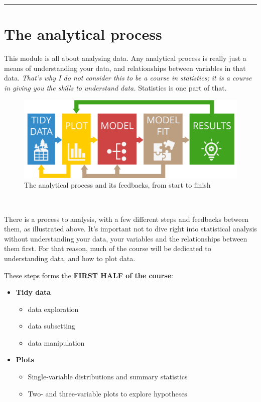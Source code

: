 \documentclass[
]{book}
\providecommand{\tightlist}{%
  \setlength{\itemsep}{0pt}\setlength{\parskip}{0pt}}
\begin{document}
\begin{center}\rule{0.5\linewidth}{0.5pt}\end{center}

\hypertarget{the-analytical-process}{%
\section{The analytical process}\label{the-analytical-process}}

This module is all about analysing data.
Any analytical process is really just a means of understanding your data, and
relationships between variables in that data. \emph{That's why I do not consider this}
\emph{to be a course in statistics; it is a course in giving you the skills to}
\emph{understand data.} Statistics is one part of that.\\
\hspace*{0.333em}

\begin{figure}
\centering
\includegraphics{Process.png}
\caption{The analytical process and its feedbacks, from start to finish}
\end{figure}

~

There is a process to analysis, with a few different steps and feedbacks between
them, as illustrated above. It's important not to dive right into statistical
analysis without understanding your data, your variables and the relationships
between them first. For that reason, much of the course will be dedicated to
understanding data, and how to plot data.

These steps forms the \textbf{FIRST HALF of the course}:

\begin{itemize}
\tightlist
\item
  \textbf{Tidy data}

  \begin{itemize}
  \tightlist
  \item
    data exploration
  \item
    data subsetting
  \item
    data manipulation
  \end{itemize}
\item
  \textbf{Plots}

  \begin{itemize}
  \tightlist
  \item
    Single-variable distributions and summary statistics
  \item
    Two- and three-variable plots to explore hypotheses
  \end{itemize}
\end{itemize}
\end{document}
